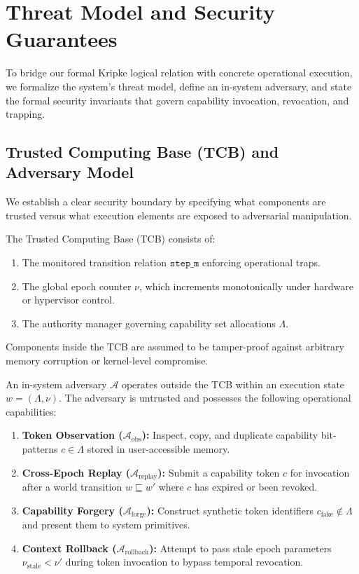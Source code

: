 \section{Threat Model and Security Guarantees}
\label{sec:threat_model}

To bridge our formal Kripke logical relation with concrete operational execution, we formalize the system's threat model, define an in-system adversary, and state the formal security invariants that govern capability invocation, revocation, and trapping.

\subsection{Trusted Computing Base (TCB) and Adversary Model}

We establish a clear security boundary by specifying what components are trusted versus what execution elements are exposed to adversarial manipulation.

\begin{definition}
The Trusted Computing Base (TCB) consists of:
\begin{enumerate}
    \item The monitored transition relation $\mathtt{step\_m}$ enforcing operational traps.
    \item The global epoch counter $\nu$, which increments monotonically under hardware or hypervisor control.
    \item The authority manager governing capability set allocations $\Lambda$.
\end{enumerate}
Components inside the TCB are assumed to be tamper-proof against arbitrary memory corruption or kernel-level compromise.
\end{definition}

\begin{definition}
An in-system adversary $\mathcal{A}$ operates outside the TCB within an execution state $w = (\Lambda, \nu)$. The adversary is untrusted and possesses the following operational capabilities:
\begin{enumerate}
    \item \textbf{Token Observation ($\mathcal{A}_{\text{obs}}$):} Inspect, copy, and duplicate capability bit-patterns $c \in \Lambda$ stored in user-accessible memory.
    \item \textbf{Cross-Epoch Replay ($\mathcal{A}_{\text{replay}}$):} Submit a capability token $c$ for invocation after a world transition $w \sqsubseteq w'$ where $c$ has expired or been revoked.
    \item \textbf{Capability Forgery ($\mathcal{A}_{\text{forge}}$):} Construct synthetic token identifiers $c_{\text{fake}} \notin \Lambda$ and present them to system primitives.
    \item \textbf{Context Rollback ($\mathcal{A}_{\text{rollback}}$):} Attempt to pass stale epoch parameters $\nu_{\text{stale}} < \nu'$ during token invocation to bypass temporal revocation.
\end{enumerate}
\end{definition}

